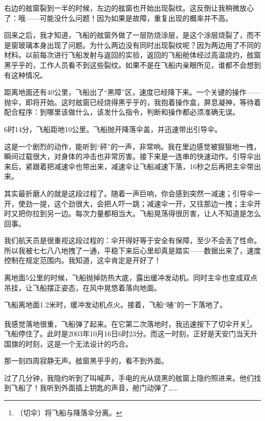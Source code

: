 \documentclass[12pt,UTF-8,openany]{ctexbook}
\begin{document}
\begin{large}
    右边的舷窗裂到一半的时候，左边的舷窗也开始出现裂纹。这反倒让我稍微放心了：哦——可能没什么问题！因为如果是故障，重复出现的概率并不高。
    
    回来之后，我才知道，飞船的舷窗外做了一层防烧涂层，是这个涂层烧裂了，而不是窗玻璃本身出现了问题。为什么两边没有同时出现裂纹呢？因为两边用了不同的材料。以前每次进行飞船发射与返回的实验，返回的飞船舱体经过高温烧灼，舷窗黑乎乎的，工作人员看不到这些裂纹。如果不是在飞船内亲眼所见，谁都不会想到有这种情况。
    
    距离地面还有40公里，飞船出了“黑障”区，速度已经降下来。一个关键的操作——抛伞，即将开始。这时舷窗已经烧得黑乎乎的，我抱着操作盒，屏息凝神，等待着配合程序：到哪里该做什么，该发什么指令，判断和操作都必须准确无误。
    
    6时14分，飞船距地10公里。飞船抛开降落伞盖，并迅速带出引导伞。
    
    这是一个剧烈的动作，能听到“砰”的一声，非常响。我在里边感觉被狠狠地一拽，瞬间过载很大，对身体的冲击也非常厉害。接下来是一连串的快速动作。引导伞出来后，紧跟着把减速伞也带出来，减速伞让飞船减速下落，16秒之后再把主伞带出来。
    
    其实最折磨人的就是这段过程了。随着一声巨响，你会感到突然一减速；引导伞一开，使劲一提，这个劲很大，会把人吓一跳；减速伞一开，又往那边一拽；主伞开时又把你拉到另一边。每次力量都相当大。飞船晃荡得很厉害，让人不知道是怎么回事。
    
    我们航天员是很重视这段过程的：伞开得好等于安全有保障，至少不会丢了性命。所以我被七七八八地拽了一通，平稳下来后心里却真是踏实——数据出来了，速度控制在规定范围内。我知道，这伞肯定是开好了！
    
    离地面5公里的时候，飞船抛掉防热大底，露出缓冲发动机。同时主伞也变成双点吊挂，让飞船摆正姿态，在风中晃悠着落向地面。
    
    飞船离地面1.2米时，缓冲发动机点火。接着，飞船“嗵”的一下落地了。
    
    我感觉落地很重，飞船弹了起来。在它第二次落地时，我迅速按下了切伞开关\footnote{〔切伞〕将飞船与降落伞分离。}。飞船停住了。此时是2003年10月16日6时23分。而这一时刻，正好是天安门当天升国旗的时刻，这是一个无法设计的巧合。
    
    那一刻四周寂静无声。舷窗黑乎乎的，看不到外面。
    
    过了几分钟，我隐约听到了叫喊声，手电的光从烧黑的舷窗上隐约照进来。他们找到飞船了！我听到外面插上钥匙的声音，舱门动弹了……
    
\end{large}
\end{document}
